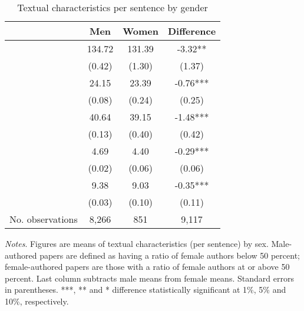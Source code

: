 \begin{table}
    \footnotesize
    \centering
    \begin{threeparttable}
        \caption{Textual characteristics per sentence by gender}
        \label{table2}
        \begin{tabular}{p{4cm}S@{}S@{}S@{}}
            \toprule
            &{Men}&{Women}&{Difference}\\
            \midrule
                &      134.72&      131.39&       -3.32** \\
                                          &      (0.42)&      (1.30)&      (1.37)   \\
                     &       24.15&       23.39&       -0.76***\\
                                          &      (0.08)&      (0.24)&      (0.25)   \\
                 &       40.64&       39.15&       -1.48***\\
                                          &      (0.13)&      (0.40)&      (0.42)   \\
            &        4.69&        4.40&       -0.29***\\
                                          &      (0.02)&      (0.06)&      (0.06)   \\
            &        9.38&        9.03&       -0.35***\\
                                          &      (0.03)&      (0.10)&      (0.11)   \\
            \midrule
            No. observations              &       8,266&         851&       9,117   \\
            \bottomrule
        \end{tabular}
        \begin{tablenotes}
            \tiny
            \item \textit{Notes}. Figures are means of textual characteristics (per sentence) by sex. Male-authored papers are defined as having a ratio of female authors below 50 percent; female-authored papers are those with a ratio of female authors at or above 50 percent. Last column subtracts male means from female means. Standard errors in parentheses. ***, ** and * difference statistically significant at 1\%, 5\% and 10\%, respectively.
        \end{tablenotes}
    \end{threeparttable}
\end{table}